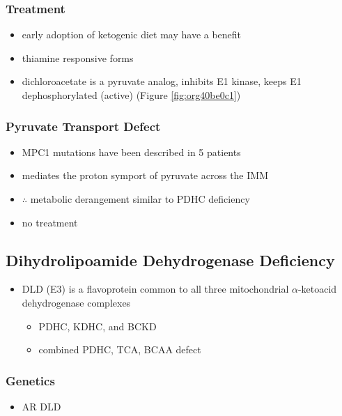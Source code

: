 \documentclass[12pt]{scrartcl}
\begin{document}
\subsubsection{Treatment}
\label{sec:orgbb7e447}
\begin{itemize}
\item early adoption of ketogenic diet may have a benefit
\item thiamine responsive forms
\item dichloroacetate is a pyruvate analog, inhibits E1 kinase, keeps E1
dephosphorylated (active) (Figure \ref{fig:org40be0c1})
\end{itemize}

\subsubsection{Pyruvate Transport Defect}
\label{sec:org532406b}
\begin{itemize}
\item MPC1 mutations have been described in 5 patients
\item mediates the proton symport of pyruvate across the IMM
\item \(\therefore\) metabolic derangement similar to PDHC deficiency
\item no treatment
\end{itemize}

\subsection{Dihydrolipoamide Dehydrogenase Deficiency}
\label{sec:orga62f2d0}
\begin{itemize}
\item DLD (E3) is a flavoprotein common to all three mitochondrial
\(\alpha\)-ketoacid dehydrogenase complexes
\begin{itemize}
\item PDHC, KDHC, and BCKD
\item combined PDHC, TCA, BCAA defect
\end{itemize}
\end{itemize}
\subsubsection{Genetics}
\label{sec:org2db4734}
\begin{itemize}
\item AR DLD
\end{itemize}
\end{document}
